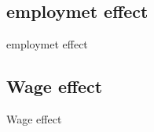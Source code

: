 \documentclass[10pt,aspectratio=43,mathserif,table]{beamer}
\begin{document}
\subsection{employmet effect}
\begin{frame}{employmet effect}
	\begin{figure}[thpb]
		\centering
	\end{figure}
\end{frame}

\subsection{Wage effect}
\begin{frame}{Wage effect}
	\begin{figure}[thpb]
		\centering
	\end{figure}
\end{frame}
\end{document}
